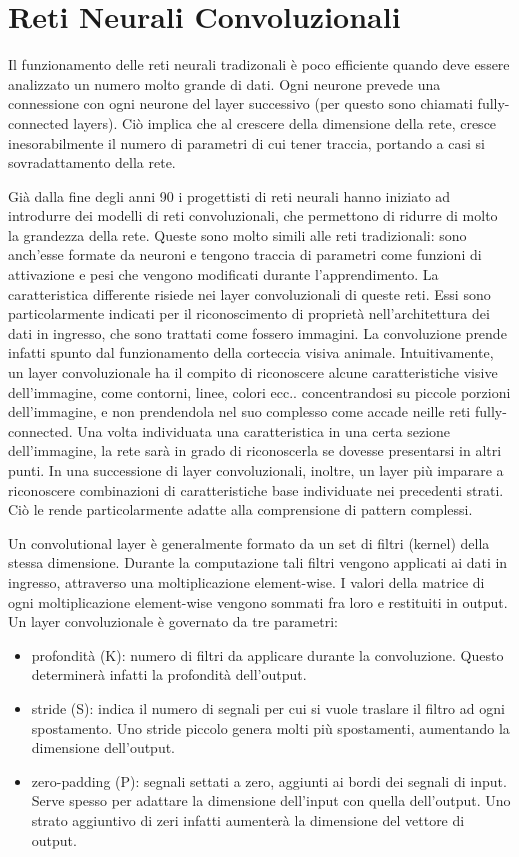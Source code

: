\documentclass{article}
\begin{document}
\section{Reti Neurali Convoluzionali}
Il funzionamento delle reti neurali tradizonali è poco efficiente quando deve essere analizzato un numero molto grande di dati. Ogni neurone prevede una connessione con ogni neurone del layer successivo (per questo sono chiamati fully-connected layers). Ciò implica che al crescere della dimensione della rete, cresce inesorabilmente il numero di parametri di cui tener traccia, portando a casi si sovradattamento della rete.

Già dalla fine degli anni 90 i progettisti di reti neurali hanno iniziato ad introdurre dei modelli di reti convoluzionali, che permettono di ridurre di molto la grandezza della rete. Queste sono molto simili alle reti tradizionali: sono anch'esse formate da neuroni e tengono traccia di parametri come funzioni di attivazione e pesi che vengono modificati durante l'apprendimento. La caratteristica differente risiede nei layer convoluzionali di queste reti. Essi sono particolarmente indicati per il riconoscimento di proprietà nell'architettura dei dati in ingresso, che sono trattati come fossero immagini. La convoluzione prende infatti spunto dal funzionamento della corteccia visiva animale. Intuitivamente, un layer convoluzionale ha il compito di riconoscere alcune caratteristiche visive dell'immagine, come contorni, linee, colori ecc.. concentrandosi su piccole porzioni dell'immagine, e non prendendola nel suo complesso come accade neille reti fully-connected. Una volta individuata una caratteristica in una certa sezione dell'immagine, la rete sarà in grado di riconoscerla se dovesse presentarsi in altri punti. In una successione di layer convoluzionali, inoltre, un layer più imparare a riconoscere combinazioni di caratteristiche base individuate nei precedenti strati. Ciò le rende particolarmente adatte alla comprensione di pattern complessi.

Un convolutional layer è generalmente formato da un set di filtri (kernel) della stessa dimensione. Durante la computazione tali filtri vengono applicati ai dati in ingresso, attraverso una moltiplicazione element-wise. I valori della matrice di ogni moltiplicazione element-wise vengono sommati fra loro e restituiti in output.
Un layer convoluzionale è governato da tre parametri:
\begin{itemize}
\item profondità (K): numero di filtri da applicare durante la convoluzione. Questo determinerà infatti la profondità dell'output.
\item stride (S): indica il numero di segnali per cui si vuole traslare il filtro ad ogni spostamento. Uno stride piccolo genera molti più spostamenti, aumentando la dimensione dell'output. 
\item zero-padding (P): segnali settati a zero, aggiunti ai bordi dei segnali di input. Serve spesso per adattare la dimensione dell'input con quella dell'output. Uno strato aggiuntivo di zeri infatti aumenterà la dimensione del vettore di output. 
\end{itemize}
\end{document}
